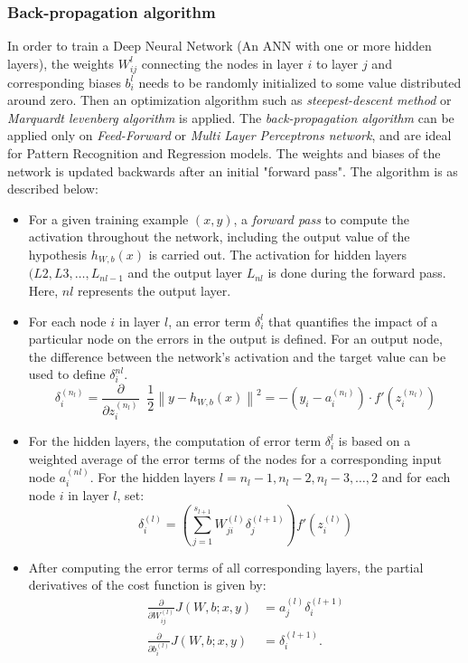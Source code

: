 \subsubsection{Back-propagation algorithm}
In order to train a Deep Neural Network (An ANN with one or more hidden layers), the weights $W_{ij}^l$ connecting the nodes in layer $i$ to layer $j$ and corresponding biases $b_{i}^l$ needs to be randomly initialized to some value distributed around zero. Then an optimization algorithm such as \textit{steepest-descent method} or \textit{Marquardt levenberg algorithm} is applied. The \textit{back-propagation algorithm} can be applied only on \textit{Feed-Forward} or \textit{Multi Layer Perceptrons network}, and are ideal for Pattern Recognition and Regression models. The weights and biases of the network is updated backwards after an initial "forward pass". The algorithm is as described below:
\begin{itemize}
\item For a given training example $(x,y)$, a \textit{forward pass} to compute the activation throughout the network, including the output value of the hypothesis $h_{W,b}(x)$ is carried out. The activation for hidden layers $(L2,L3,\dots,L_{nl-1}$ and the output layer $L_{nl}$ is done during the forward pass. Here, $nl$ represents the output layer.
\item For each node $i$ in layer $l$, an error term $\delta_{i}^{l}$ that quantifies the impact of a particular node on the errors in the output is defined. For an output node, the difference between the network's activation and the target value can be used to define $\delta_{i}^{nl}$.
\begin{equation}
\delta^{(n_l)}_i
= \frac{\partial}{\partial z^{(n_l)}_i} \;\;
        \frac{1}{2} \left\|y - h_{W,b}(x)\right\|^2 = - (y_i - a^{(n_l)}_i) \cdot f'(z^{(n_l)}_i)
\end{equation}
\item For the hidden layers, the computation of error term $\delta_{i}^{l}$ is based on a weighted average of the error terms of the nodes for a corresponding input node $a_i^{\left(nl\right)}$. For the hidden layers $l = n_l-1, n_l-2, n_l-3, \ldots, 2$ and for each node $i$ in layer $l$, set:
\begin{equation}
\delta^{(l)}_i = \left( \sum_{j=1}^{s_{l+1}} W^{(l)}_{ji} \delta^{(l+1)}_j \right) f'(z^{(l)}_i)
\end{equation}
\item After computing the error terms of all corresponding layers, the partial derivatives of the cost function is given by:
\begin{align}
\frac{\partial}{\partial W_{ij}^{(l)}} J(W,b; x, y) &= a^{(l)}_j \delta_i^{(l+1)} \\
\frac{\partial}{\partial b_{i}^{(l)}} J(W,b; x, y) &= \delta_i^{(l+1)}.
\end{align}
\end{itemize}

